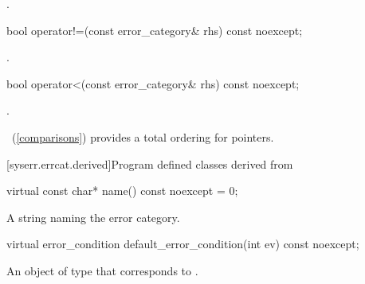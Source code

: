 \begin{itemdescr}
\pnum
\returns {}.
\end{itemdescr}

\begin{itemdecl}
bool operator!=(const error_category& rhs) const noexcept;
\end{itemdecl}

\begin{itemdescr}
\pnum
\returns {}.
\end{itemdescr}

\begin{itemdecl}
bool operator<(const error_category& rhs) const noexcept;
\end{itemdecl}

\begin{itemdescr}
\pnum
\returns {}.

\begin{note} ~(\ref{comparisons}) provides a total ordering for pointers. \end{note}
\end{itemdescr}

[syserr.errcat.derived]{Program defined classes derived from }

\begin{itemdecl}
virtual const char* name() const noexcept = 0;
\end{itemdecl}

\begin{itemdescr}
\pnum
\returns A string naming the error category.
\end{itemdescr}

\begin{itemdecl}
virtual error_condition default_error_condition(int ev) const noexcept;
\end{itemdecl}

\begin{itemdescr}
\pnum
\returns An object of type  that corresponds to .
\end{itemdescr}

